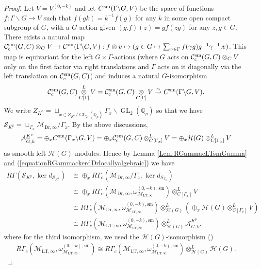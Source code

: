 \documentclass{article}
\theoremstyle{definition}
\def\calA{\mathcal{A}}
\def\calC{\mathcal{C}}
\def\calH{\mathcal{H}}
\def\calM{\mathcal{M}}
\def\calS{\mathcal{S}}
\def\bbQ{\mathbb{Q}}
\DeclareMathOperator{\ox}{\otimes}
\def\isom{\cong}
\DeclareMathOperator{\GL}{GL}
\def\LT{\mathrm{LT}}
\def\sm{\mathrm{sm}}
\def\bar{\overline}
\def\Dr{\mathrm{Dr}}
\begin{document}
\begin{proof}
    Let $V=V^{(0,-k)}$ and let $C^{\rm sm}(\Gamma\backslash G,V)$ be the space of functions $f:\Gamma\backslash G\to V$ such that $f(gk)=k^{-1}f(g)$ for any $k$ in some open compact subgroup of $G$, with a $G$-action given $(g.f)(z)=gf(zg)$ for any $z,g\in G$. There exists a natural map $\calC_c^{\rm sm}(G,C)\otimes_C V\rightarrow \calC^{\rm sm}(\Gamma\backslash G,V):f\otimes v\mapsto (g\in G\mapsto \sum_{\gamma\in\Gamma}f(\gamma g)g^{-1}\gamma^{-1}.v)$. This map is equivariant for the left $G\times \Gamma$-actions (where $G$ acts on $\calC_c^{\rm sm}(G,C)\otimes_C V$ only on the first factor via right translations and $\Gamma$ acts on it diagonally via the left translation on $\calC_c^{\rm sm}(G,C)$) and induces a natural $G$-isomorphism 
    \[ \calC^{\sm}_c(G,C)\ox^L_{C[\Gamma]}V=\calC^{\sm}_c(G,C)\ox_{C[\Gamma]}V\stackrel{\sim}{\rightarrow}C^{\rm sm}(\Gamma\backslash G,V).\]
    We write $Z_{K^p}=\sqcup_{x\in Z_{K^p}/\GL_2(\bbQ_p)} \Gamma_x\backslash \GL_2(\bbQ_p)$ so that we have $\calS_{K^p}=\sqcup_{\Gamma_x}\calM_{\Dr,\infty}/\Gamma_x$. By the above discussions,
    \[\calA^{K^p}_{\bar G,k}=\oplus_xC^{\rm sm}(\Gamma_x\backslash G,V)=\oplus_x \calC_c^{\rm sm}(G,C)\otimes_{C[\Gamma_x]}^LV=\oplus_x\calH(G)\otimes_{C[\Gamma_x]}^LV\]
    as smooth left $\calH(G)$-modules. Hence by Lemma \ref{Lem:RGammacLTsmGamma} and (\ref{equationRGammackerdDrlocallyalgebraic}) we have 
    \begin{align*}
        R\Gamma(\calS_{K^p},\ker d_{\calS _{K^p}})&\isom \oplus_x R\Gamma_c(\calM_{\Dr,\infty}/\Gamma_x,\ker d_{\calS_{\Gamma_x}})\\
        &\isom \oplus_x  R\Gamma_c(\calM_{\Dr,\infty},\omega_{\calM_{\LT,\infty}}^{(0,-k),\sm})\otimes_{C[\Gamma_x]}^LV\\
        &\isom  R\Gamma_c(\calM_{\Dr,\infty},\omega_{\calM_{\LT,\infty}}^{(0,-k),\sm})\otimes_{\calH(G)}^L(\oplus_x\calH(G)\otimes_{C[\Gamma_x]}^LV)\\
        &\isom R\Gamma_c(\calM_{\LT,\infty},\omega_{\calM_{\LT,\infty}}^{(0,-k),\sm})\ox_{\calH(G)}^L\calA^{K^p}_{\bar G,k}.
    \end{align*}
   where for the third isomorphism, we used the $\calH(G)$-isomorphism (\cite[(I.2.3.3)]{renard2010representations}) 
    \begin{align*}
        R\Gamma_c(\calM_{\LT,\infty},\omega_{\calM_{\LT,\infty}}^{(0,-k),\sm})\isom R\Gamma_c(\calM_{\LT,\infty},\omega_{\calM_{\LT,\infty}}^{(0,-k),\sm})\ox_{\calH(G)}^L\calH(G).
    \end{align*}


\end{proof}
\end{document}
